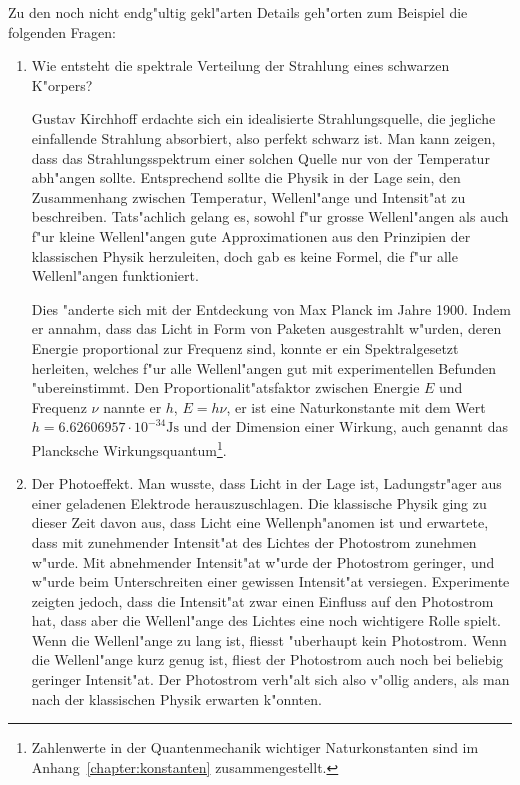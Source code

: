 Zu den noch nicht endg"ultig gekl"arten Details geh"orten
zum Beispiel die folgenden Fragen:
\begin{enumerate}
\item Wie entsteht die spektrale Verteilung der Strahlung eines
schwarzen K"orpers? 

Gustav Kirchhoff erdachte sich ein idealisierte Strahlungsquelle, 
die jegliche einfallende Strahlung absorbiert, also perfekt schwarz
ist. Man kann zeigen, dass das Strahlungsspektrum einer solchen Quelle
nur von der Temperatur abh"angen sollte. Entsprechend sollte die Physik
in der Lage sein, den Zusammenhang zwischen Temperatur, Wellenl"ange
und Intensit"at zu beschreiben. Tats"achlich gelang es, sowohl f"ur 
grosse Wellenl"angen als auch f"ur kleine Wellenl"angen gute Approximationen
aus den Prinzipien der klassischen Physik herzuleiten, doch gab es keine
Formel, die f"ur alle Wellenl"angen funktioniert.

Dies "anderte sich mit der Entdeckung von Max Planck im Jahre 1900.
Indem er annahm, dass das Licht in Form von Paketen ausgestrahlt w"urden,
deren Energie proportional zur Frequenz sind, konnte er ein Spektralgesetzt
herleiten, welches f"ur alle Wellenl"angen gut mit experimentellen
Befunden "ubereinstimmt. Den Proportionalit"atsfaktor zwischen Energie $E$
und Frequenz $\nu$ nannte er $h$, $E=h\nu$, er ist eine Naturkonstante
mit dem Wert $h=6.62606957\cdot 10^{-34}\text{Js}$ und der Dimension
einer Wirkung, auch genannt das Plancksche Wirkungsquantum\footnote{Zahlenwerte
in der Quantenmechanik wichtiger Naturkonstanten sind im
Anhang~\ref{chapter:konstanten} zusammengestellt.}.

\item
{}
Der Photoeffekt. Man wusste, dass Licht in der
Lage ist, Ladungstr"ager aus einer geladenen Elektrode herauszuschlagen.
Die klassische Physik ging zu dieser Zeit davon aus, dass Licht
eine Wellenph"anomen ist und erwartete, dass mit zunehmender Intensit"at des
Lichtes der Photostrom zunehmen w"urde.
Mit abnehmender Intensit"at w"urde der Photostrom geringer, und w"urde
beim Unterschreiten einer gewissen Intensit"at versiegen.
Experimente zeigten jedoch, dass die
Intensit"at zwar einen Einfluss auf den Photostrom hat, dass aber
die Wellenl"ange des Lichtes eine noch wichtigere Rolle spielt.
Wenn die Wellenl"ange zu lang ist, fliesst "uberhaupt kein Photostrom.
Wenn die Wellenl"ange kurz genug ist, fliest der Photostrom auch noch
bei beliebig geringer Intensit"at.
Der Photostrom verh"alt sich also v"ollig anders, als man nach der
klassischen Physik erwarten k"onnten.


\end{enumerate}
